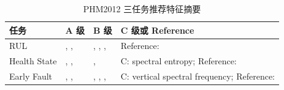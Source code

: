 \begin{table}[htbp]
\centering
\caption{PHM2012 三任务推荐特征摘要}
\label{tab:phm2012_top_features}
\small
\begin{tabularx}{\textwidth}{lYYY}
\toprule
任务 & A 级 & B 级 & C 级或 Reference \\
\midrule
RUL & , ,  & , , ,  & Reference:  \\
Health State & , ,  & ,  & C: spectral entropy; Reference:  \\
Early Fault & , ,  & , , ,  & C: vertical spectral frequency; Reference:  \\
\bottomrule
\end{tabularx}
\end{table}
